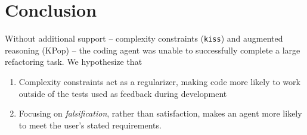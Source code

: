 \documentclass[11pt]{article}
\begin{document}
\section{Conclusion}

Without additional support -- complexity constraints (\texttt{kiss}) and augmented reasoning (KPop) -- the coding
agent was unable to successfully complete a large refactoring task. We hypothesize that
\begin{enumerate}
  \item Complexity constraints act as a regularizer, making code more likely to work outside of the tests used
  as feedback during development
  \item Focusing on \textit{falsification}, rather than satisfaction, makes an agent more likely to meet the user's stated requirements.
\end{enumerate}
\end{document}

